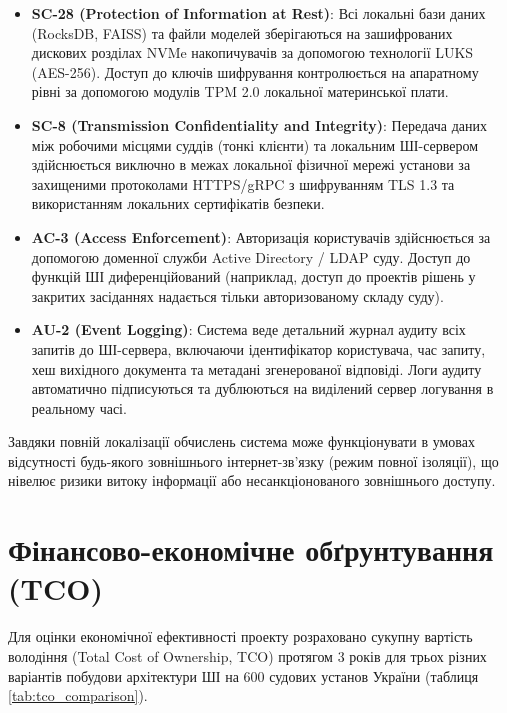 \documentclass{article}
\begin{document}
\begin{itemize}
\item \textbf{SC-28 (Protection of Information at Rest)}: Всі локальні бази даних (RocksDB, FAISS) та файли моделей зберігаються на зашифрованих дискових розділах NVMe накопичувачів за допомогою технології LUKS (AES-256). Доступ до ключів шифрування контролюється на апаратному рівні за допомогою модулів TPM 2.0 локальної материнської плати.
\item \textbf{SC-8 (Transmission Confidentiality and Integrity)}: Передача даних між робочими місцями суддів (тонкі клієнти) та локальним ШІ-сервером здійснюється виключно в межах локальної фізичної мережі установи за захищеними протоколами HTTPS/gRPC з шифруванням TLS 1.3 та використанням локальних сертифікатів безпеки.
\item \textbf{AC-3 (Access Enforcement)}: Авторизація користувачів здійснюється за допомогою доменної служби Active Directory / LDAP суду. Доступ до функцій ШІ диференційований (наприклад, доступ до проектів рішень у закритих засіданнях надається тільки авторизованому складу суду).
\item \textbf{AU-2 (Event Logging)}: Система веде детальний журнал аудиту всіх запитів до ШІ-сервера, включаючи ідентифікатор користувача, час запиту, хеш вихідного документа та метадані згенерованої відповіді. Логи аудиту автоматично підписуються та дублюються на виділений сервер логування в реальному часі.
\end{itemize}

Завдяки повній локалізації обчислень система може функціонувати в умовах відсутності будь-якого зовнішнього інтернет-зв'язку (режим повної ізоляції), що нівелює ризики витоку інформації або несанкціонованого зовнішнього доступу.

\section{Фінансово-економічне обґрунтування (TCO)}
Для оцінки економічної ефективності проекту розраховано сукупну вартість володіння (Total Cost of Ownership, TCO) протягом 3 років для трьох різних варіантів побудови архітектури ШІ на 600 судових установ України (таблиця \ref{tab:tco_comparison}).
\end{document}
